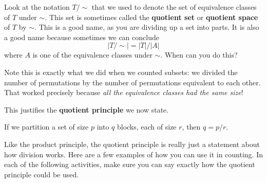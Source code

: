\documentclass[10pt,]{book}
\newcommand{\terminology}[1]{\textbf{#1}}
\theoremstyle{plain}
\theoremstyle{definition}
\theoremstyle{definition}
\theoremstyle{definition}
\numberwithin{equation}{chapter}
\begin{document}
\par
\hypertarget{p-759}{}%
Look at the notation \(T/\sim\) that we used to denote the set of equivalence classes of \(T\) under \(\sim\).  This set is sometimes called the \terminology{quotient set} or \terminology{quotient space} of \(T\) by \(\sim\).  This is a good name, as you are dividing up a set into parts.  It is also a good name because sometimes we can conclude%
\begin{equation*}
|T/\sim| = |T|/|A|
\end{equation*}
where \(A\) is one of the equivalence classes under \(\sim\).  When can you do this?%
\par
\hypertarget{p-760}{}%
Note this is exactly what we did when we counted subsets: we divided the number of permutations by the number of permutations equivalent to each other.  That worked precisely because \emph{all the equivalence classes had the same size}!%
\par
\hypertarget{p-761}{}%
This justifies the \terminology{quotient principle} we now state.%
\begin{assemblage}\label{assemblage-quotientprinciple}
\hypertarget{p-762}{}%
If we partition a set of size \(p\) into \(q\) blocks, each of size \(r\), then \(q = p/r\).%
\end{assemblage}
\hypertarget{p-763}{}%
Like the product principle, the quotient principle is really just a statement about how division works.  Here are a few examples of how you can use it in counting.  In each of the following activities, make sure you can say exactly how the quotient principle could be used.%
\end{document}
